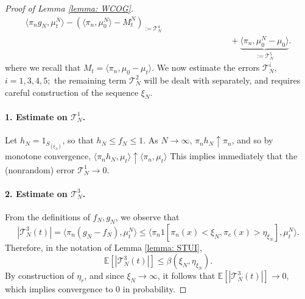 \begin{proof}[Proof of Lemma \ref{lemma: WCOG}]
\begin{equation}
\begin{split}
{   \langle \pi_n g_N, \mu^N_t\rangle - (\langle \pi_n, \mu^N_0\rangle-M^N_t)}_{:=\mathcal{T}^4_N}
   \\[1ex]&\hspace{3cm}+ \underbrace{\langle \pi_n, \mu^N_0-\mu_0\rangle}_{:=\mathcal{T}^5_N} .\end{split} \end{equation} where we recall that $M_t=\langle \pi_n, \mu_0-\mu_t\rangle$. We now estimate the errors $\mathcal{T}^i_N$, $i=1,3,4,5;$ the remaining term $\mathcal{T}^2_N$ will be dealt with separately, and requires careful construction of the sequence $\xi_N$. \paragraph{1. Estimate on $\mathcal{T}^1_N$.} Let $h_N=1_{S_{(\xi_N)}}$, so that $h_N \le f_N \le 1$. As $N\rightarrow \infty$, $\pi_n h_N \uparrow \pi_n$, and so by monotone convergence, $
       \langle \pi_n h_N, \mu_t\rangle \uparrow \langle \pi_n, \mu_t\rangle$ This implies immediately that the (nonrandom) error $\mathcal{T}^1_N \rightarrow 0$.
\paragraph{2. Estimate on $\mathcal{T}^3_N$.} From the definitions of $f_N, g_N$, we observe that \begin{equation}
       |\mathcal{T}^3_N(t)|=\langle \pi_n(g_N-f_N), \mu^N_t\rangle \le  \langle \pi_n 1[\pi_n(x)<\xi_N, \pi_e(x)>\eta_{\xi_N}], \mu^N_t\rangle.
   \end{equation} Therefore, in the notation of Lemma \ref{lemma: STUI}, \begin{equation}
       \mathbb{E}\left[|\mathcal{T}^3_N(t)|\right] \leq \beta(\xi_N, \eta_{\xi_N}).
   \end{equation} By construction of $\eta_r$, and since $\xi_N \rightarrow \infty$, it follows that $\mathbb{E}[ |\mathcal{T}^3_N(t)|] \rightarrow 0,$ which implies convergence to $0$ in probability.

\end{proof}

